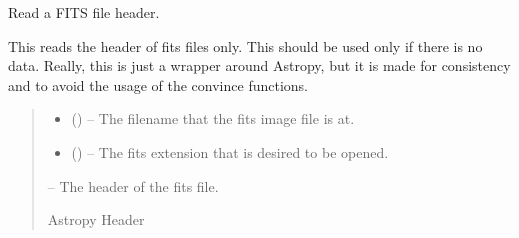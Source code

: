 \documentclass[letterpaper,11pt,english]{sphinxmanual}
\begin{document}

\begin{savenotes}\begin{fulllineitems}
\label{\detokenize{code/lezargus.library.fits:lezargus.library.fits.read_fits_header}}
\pysigstartsignatures
{}
\pysigstopsignatures
\sphinxAtStartPar
Read a FITS file header.

\sphinxAtStartPar
This reads the header of fits files only. This should be used only if
there is no data. Really, this is just a wrapper around Astropy, but it
is made for consistency and to avoid the usage of the convince functions.
\begin{quote}\begin{description}
\begin{itemize}
\item {} 
\sphinxAtStartPar
{} () – The filename that the fits image file is at.

\item {} 
\sphinxAtStartPar
{} (\sphinxstyleliteralemphasis{\sphinxupquote{, }}) – The fits extension that is desired to be opened.

\end{itemize}

\sphinxAtStartPar
{} – The header of the fits file.

\sphinxAtStartPar
Astropy Header

\end{description}\end{quote}

\end{fulllineitems}\end{savenotes}
\end{document}
